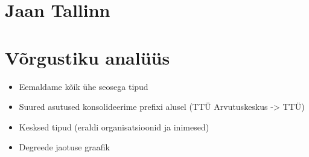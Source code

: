 \documentclass{tufte-book}
\let\oldchapter\chapter
\def\chapter{%
  \setcounter{footnote}{0}%
  \oldchapter
}
\begin{document}
\chapter{Jaan Tallinn}



\chapter{Võrgustiku analüüs}
\begin{itemize}
	\item Eemaldame kõik ühe seosega tipud
	\item Suured asutused konsolideerime prefixi alusel (TTÜ Arvutuskeskus -> TTÜ)
	\item Kesksed tipud (eraldi organisatsioonid ja inimesed)
	\item Degreede jaotuse graafik
\end{itemize}
\end{document}
